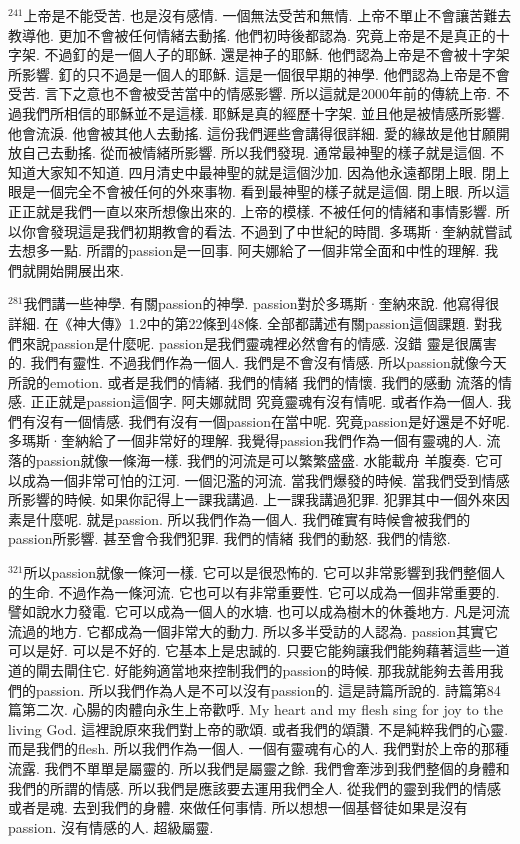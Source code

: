 \documentclass{book}
\begin{document}
$^{241}$上帝是不能受苦.
也是沒有感情.
一個無法受苦和無情.
上帝不單止不會讓苦難去教導他.
更加不會被任何情緒去動搖.
他們初時後都認為.
究竟上帝是不是真正的十字架.
不過釘的是一個人子的耶穌.
還是神子的耶穌.
他們認為上帝是不會被十字架所影響.
釘的只不過是一個人的耶穌.
這是一個很早期的神學.
他們認為上帝是不會受苦.
言下之意也不會被受苦當中的情感影響.
所以這就是2000年前的傳統上帝.
不過我們所相信的耶穌並不是這樣.
耶穌是真的經歷十字架.
並且他是被情感所影響.
他會流淚.
他會被其他人去動搖.
這份我們遲些會講得很詳細.
愛的緣故是他甘願開放自己去動搖.
從而被情緒所影響.
所以我們發現.
通常最神聖的樣子就是這個.
不知道大家知不知道.
四月清史中最神聖的就是這個沙加.
因為他永遠都閉上眼.
閉上眼是一個完全不會被任何的外來事物.
看到最神聖的樣子就是這個.
閉上眼.
所以這正正就是我們一直以來所想像出來的.
上帝的模樣.
不被任何的情緒和事情影響.
所以你會發現這是我們初期教會的看法.
不過到了中世紀的時間.
多瑪斯·奎納就嘗試去想多一點.
所謂的passion是一回事.
阿夫娜給了一個非常全面和中性的理解.
我們就開始開展出來.

$^{281}$我們講一些神學.
有關passion的神學.
passion對於多瑪斯·奎納來說.
他寫得很詳細.
在《神大傳》1.2中的第22條到48條.
全部都講述有關passion這個課題.
對我們來說passion是什麼呢.
passion是我們靈魂裡必然會有的情感.
沒錯 靈是很厲害的.
我們有靈性.
不過我們作為一個人.
我們是不會沒有情感.
所以passion就像今天所說的emotion.
或者是我們的情緒.
我們的情緒 我們的情懷.
我們的感動 流落的情感.
正正就是passion這個字.
阿夫娜就問 究竟靈魂有沒有情呢.
或者作為一個人.
我們有沒有一個情感.
我們有沒有一個passion在當中呢.
究竟passion是好還是不好呢.
多瑪斯·奎納給了一個非常好的理解.
我覺得passion我們作為一個有靈魂的人.
流落的passion就像一條海一樣.
我們的河流是可以繁繁盛盛.
水能載舟 羊腹奏.
它可以成為一個非常可怕的江河.
一個氾濫的河流.
當我們爆發的時候.
當我們受到情感所影響的時候.
如果你記得上一課我講過.
上一課我講過犯罪.
犯罪其中一個外來因素是什麼呢.
就是passion.
所以我們作為一個人.
我們確實有時候會被我們的passion所影響.
甚至會令我們犯罪.
我們的情緒 我們的動怒.
我們的情慾.

$^{321}$所以passion就像一條河一樣.
它可以是很恐怖的.
它可以非常影響到我們整個人的生命.
不過作為一條河流.
它也可以有非常重要性.
它可以成為一個非常重要的.
譬如說水力發電.
它可以成為一個人的水塘.
也可以成為樹木的休養地方.
凡是河流流過的地方.
它都成為一個非常大的動力.
所以多半受訪的人認為.
passion其實它可以是好.
可以是不好的.
它基本上是忠誠的.
只要它能夠讓我們能夠藉著這些一道道的閘去閘住它.
好能夠適當地來控制我們的passion的時候.
那我就能夠去善用我們的passion.
所以我們作為人是不可以沒有passion的.
這是詩篇所說的.
詩篇第84篇第二次.
心腸的肉體向永生上帝歡呼.
My heart and my flesh sing for joy to the living God.
這裡說原來我們對上帝的歌頌.
或者我們的頌讚.
不是純粹我們的心靈.
而是我們的flesh.
所以我們作為一個人.
一個有靈魂有心的人.
我們對於上帝的那種流露.
我們不單單是屬靈的.
所以我們是屬靈之餘.
我們會牽涉到我們整個的身體和我們的所謂的情感.
所以我們是應該要去運用我們全人.
從我們的靈到我們的情感或者是魂.
去到我們的身體.
來做任何事情.
所以想想一個基督徒如果是沒有passion.
沒有情感的人.
超級屬靈.
\end{document}
